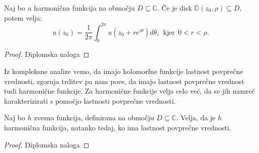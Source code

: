 \documentclass[mat1]{fmfdelo}
\newcommand{\C}{\mathbb C}
\begin{document}
    \begin{trditev}
        Naj bo $u$ harmonična funkcija na območju $D \subseteq \C$. Če je disk $\overline{\mathbb{D}}(z_0, \rho) \subseteq D$, potem velja:
            $$
                u(z_0) = \frac{1}{2 \pi} \int_{0}^{2 \pi}{u(z_0 + r e^{i \theta}) d\theta},~~\text{kjer}~~ 0 < r < \rho.
            $$
    \end{trditev}
    \begin{proof}
        Diplomska naloga
    \end{proof}
    \begin{opomba}
        Iz kompleksne analize vemo, da imajo holomorfne funkcije lastnost povprečne vrednosti, zgornja trditev pa nam pove, da imajo lastnost povprečne vrednost tudi harmonične funkcije. 
        Za harmonične funkcije velja celo več, da se jih namreč karakterizirati s pomočjo lastnosti povprečne vrednosti. 
    \end{opomba}
    \begin{trditev}
        Naj bo $h$ zvezna funkcija, definirana na območju $D \subseteq \C$. Velja, da je $h$ harmonična funkcija, natanko tedaj, ko ima lastnost povprečne vrednosti.
    \end{trditev}
    \begin{proof}
        Diplomska naloga
    \end{proof}

\newpage
\end{document}
